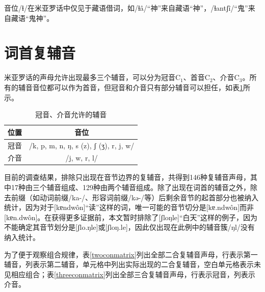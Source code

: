 音位/ɬ/在米亚罗话中仅见于藏语借词，如/ɬâ/“神”来自藏语“神”，/ɬantʃî/“鬼”来自藏语“鬼神”。

\section{词首复辅音}

米亚罗话的声母允许出现最多三个辅音，可以分为冠音C$_{1}$、首音C$_{2}$、介音C$_{3}$。所有的辅音音位都可以作为首音，但冠音和介音只有部分辅音可以担任，如表\ref{premedialex}所示。

\begin{table}[H]
\vspace{5pt}
    \centering
    \caption{冠音、介音允许的辅音}
    \label{premedialex}
\begin{tabular}{cc}
   \toprule
    位置 & 音位 \\
   \midrule
   冠音 &  /k, p, m, n, ŋ, s (z), ʃ (ʒ), r, j, w/ \\
   介音 & /j, w, r, l/ \\
   \bottomrule
\end{tabular}
\end{table}

目前的调查结果，排除只出现在音节边界的复辅音，共得到146种复辅音声母，其中17种由三个辅音组成、129种由两个辅音组成。除了出现在词首的辅音之外，除去前缀（如动词前缀/ka-/、形容词前缀/kə-/等）后剩余音节的起首部分也被纳入统计，因为对于[kɐndwôn]“读”这样的词，唯一可能的音节切分是[kɐ.ndwôn]而非[kɐn.dwôn]。在获得更多证据前，本文暂时排除了[ʃloŋle]“白天”这样的例子，因为不能确定其音节划分是[ʃlo.ŋle]或[ʃloŋ.le]，因此仅出现在此例中的辅音簇/ŋl/没有纳入统计。

为了便于观察组合规律，表\ref{twoconmatrix}列出全部二合复辅音声母，行表示第一辅音，列表示第二辅音，单元格中列出实际出现的二合复辅音，空白单元格表示未见相应组合；表\ref{threeconmatrix}列出全部三合复辅音声母，行表示冠音，列表示介音。

\clearpage

